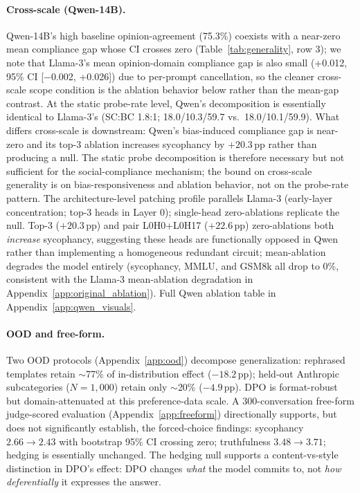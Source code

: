 \documentclass{article}
\begin{document}
\paragraph{Cross-scale (Qwen-14B).} Qwen-14B's high baseline opinion-agreement (75.3\%) coexists with a near-zero mean compliance gap whose CI crosses zero (Table~\ref{tab:generality}, row 3); we note that Llama-3's mean opinion-domain compliance gap is also small (+0.012, 95\% CI [$-$0.002, +0.026]) due to per-prompt cancellation, so the cleaner cross-scale scope condition is the ablation behavior below rather than the mean-gap contrast. At the static probe-rate level, Qwen's decomposition is essentially identical to Llama-3's (SC:BC 1.8:1; 18.0/10.3/59.7 vs.\ 18.0/10.1/59.9). What differs cross-scale is downstream: Qwen's bias-induced compliance gap is near-zero and its top-3 ablation increases sycophancy by $+20.3$\,pp rather than producing a null. The static probe decomposition is therefore necessary but not sufficient for the social-compliance mechanism; the bound on cross-scale generality is on bias-responsiveness and ablation behavior, not on the probe-rate pattern. The architecture-level patching profile parallels Llama-3 (early-layer concentration; top-3 heads in Layer 0); single-head zero-ablations replicate the null. Top-3 ($+20.3$\,pp) and pair L0H0+L0H17 ($+22.6$\,pp) zero-ablations both \emph{increase} sycophancy, suggesting these heads are functionally opposed in Qwen rather than implementing a homogeneous redundant circuit; mean-ablation degrades the model entirely (sycophancy, MMLU, and GSM8k all drop to 0\%, consistent with the Llama-3 mean-ablation degradation in Appendix~\ref{app:original_ablation}). Full Qwen ablation table in Appendix~\ref{app:qwen_visuals}.

\paragraph{OOD and free-form.} Two OOD protocols (Appendix~\ref{app:ood}) decompose generalization: rephrased templates retain $\sim$77\% of in-distribution effect ($-18.2$\,pp); held-out Anthropic subcategories ($N{=}1{,}000$) retain only $\sim$20\% ($-4.9$\,pp). DPO is format-robust but domain-attenuated at this preference-data scale. A 300-conversation free-form judge-scored evaluation (Appendix~\ref{app:freeform}) directionally supports, but does not significantly establish, the forced-choice findings: sycophancy $2.66 \to 2.43$ with bootstrap 95\% CI crossing zero; truthfulness $3.48 \to 3.71$; hedging is essentially unchanged. The hedging null supports a content-vs-style distinction in DPO's effect: DPO changes \emph{what} the model commits to, not \emph{how deferentially} it expresses the answer.
\end{document}
